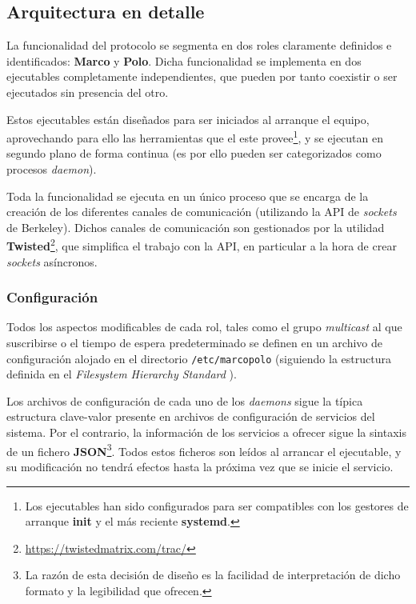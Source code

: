 \subsection{Arquitectura en detalle}

La funcionalidad del protocolo se segmenta en dos roles claramente definidos e identificados: \textbf{Marco} y \textbf{Polo}. Dicha funcionalidad se implementa en dos ejecutables completamente independientes, que pueden por tanto coexistir o ser ejecutados sin presencia del otro.

Estos ejecutables están diseñados para ser iniciados al arranque el equipo, aprovechando para ello las herramientas que el este provee\footnote{Los ejecutables han sido configurados para ser compatibles con los gestores de arranque \textbf{init} y el más reciente \textbf{systemd}.}, y se ejecutan en segundo plano de forma continua (es por ello pueden ser categorizados como procesos \textit{daemon}).

Toda la funcionalidad se ejecuta en un único proceso que se encarga de la creación de los diferentes canales de comunicación (utilizando la API de \textit{sockets} de Berkeley). Dichos canales de comunicación son gestionados por la utilidad \textbf{Twisted}\footnote{\href{https://twistedmatrix.com/trac/}{https://twistedmatrix.com/trac/}}, que simplifica el trabajo con la API, en particular a la hora de crear \textit{sockets} asíncronos.

\subsubsection{Configuración}

Todos los aspectos modificables de cada rol, tales como el grupo \textit{multicast} al que suscribirse o el tiempo de espera predeterminado se definen en un archivo de configuración alojado en el directorio \texttt{/etc/marcopolo} (siguiendo la estructura definida en el \textit{Filesystem Hierarchy Standard} \cite{fhs}).


Los archivos de configuración de cada uno de los \textit{daemons} sigue la típica estructura clave-valor presente en archivos de configuración de servicios del sistema. Por el contrario, la información de los servicios a ofrecer sigue la sintaxis de un fichero \textbf{JSON}\footnote{La razón de esta decisión de diseño es la facilidad de interpretación de dicho formato y la legibilidad que ofrecen.}. Todos estos ficheros son leídos al arrancar el ejecutable, y su modificación no tendrá efectos hasta la próxima vez que se inicie el servicio.%

